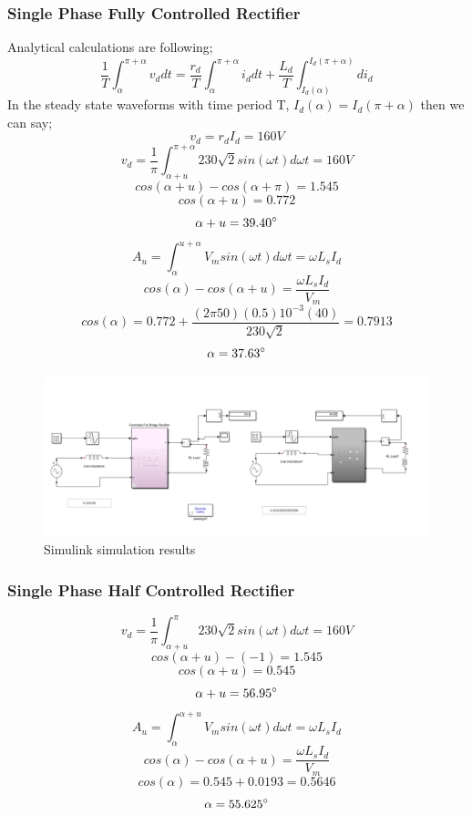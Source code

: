 \documentclass[fleqn, a4paper]{report}
\begin{document}
\subsubsection*{Single Phase Fully Controlled Rectifier}
Analytical calculations are following;
$$ \frac{1}{T}\int_{\alpha}^{\pi+\alpha}v_d dt = \frac{r_d}{T}\int_{\alpha}^{\pi+\alpha}i_d dt + \frac{L_d}{T}\int_{I_d(\alpha)}^{I_d(\pi+\alpha)}di_d $$
In the steady state waveforms with time period T, $I_d(\alpha)=I_d(\pi+\alpha)$ then we can say;
$$v_d = r_d I_d = 160 V$$
$$v_d = \frac{1}{\pi}\int_{\alpha+u}^{\pi+\alpha}230\sqrt{2}sin(\omega t)d\omega t=160V$$
$$cos(\alpha+u)-cos(\alpha+\pi)=1.545$$
$$cos(\alpha+u)=0.772$$
$$\alpha+u=39.40 \degree$$
$$A_u=\int_{\alpha}^{u+\alpha}V_msin(\omega t)d\omega t=\omega L_s I_d$$
$$cos(\alpha)-cos(\alpha+u)=\frac{\omega L_s I_d}{V_m}$$
$$cos(\alpha)=0.772+\frac{(2\pi 50)(0.5) 10^{-3} (40)}{230\sqrt{2}}=0.7913$$
$$\alpha=37.63 \degree$$
\begin{figure}
    \centering
    \includegraphics[width=15cm]{simulink-results.PNG}
    \caption{Simulink simulation results}
    \label{fig:my_label}
\end{figure}
\subsubsection*{Single Phase Half Controlled Rectifier}
$$v_d = \frac{1}{\pi}\int_{\alpha+u}^{\pi}230\sqrt{2}sin(\omega t)d\omega t=160V$$
$$cos(\alpha+u)-(-1)=1.545$$
$$cos(\alpha+u)=0.545$$
$$\alpha+u=56.95 \degree$$
$$A_u=\int_{\alpha}^{\alpha+u}V_m sin(\omega t)d\omega t=\omega L_s I_d$$
$$cos(\alpha)-cos(\alpha+u)=\frac{\omega L_s I_d}{V_m}$$
$$cos(\alpha)=0.545+0.0193=0.5646$$
$$\alpha = 55.625 \degree$$
\end{document}
